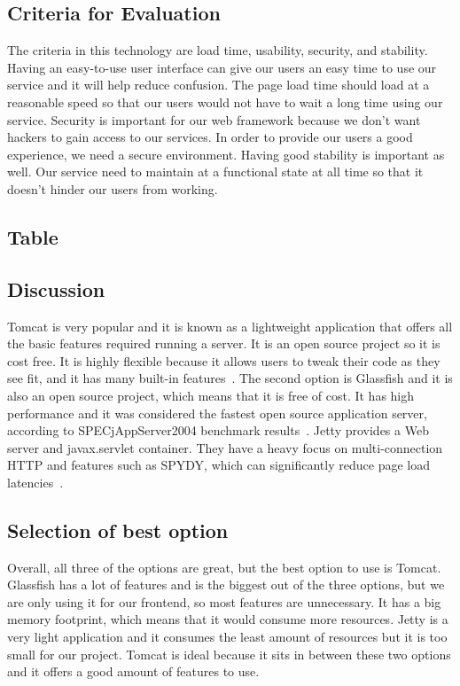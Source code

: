 \documentclass[10pt,letterpaper,onecolumn,journal]{IEEEtran}
\begin{document}
\subsection{Criteria for Evaluation}
The criteria in this technology are load time, usability, security, and stability.
Having an easy-to-use user interface can give our users an easy time to use our service and it will help reduce confusion.
The page load time should load at a reasonable speed so that our users would not have to wait a long time using our service.
Security is important for our web framework because we don’t want hackers to gain access to our services.
In order to provide our users a good experience, we need a secure environment.
Having good stability is important as well.
Our service need to maintain at a functional state at all time so that it doesn’t hinder our users from working.
\subsection{Table}
\subsection{Discussion}
Tomcat is very popular and it is known as a lightweight application that offers all the basic features required running a server.
It is an open source project so it is cost free.
It is highly flexible because it allows users to tweak their code as they see fit, and it has many built-in features~\cite{tomcat}.
The second option is Glassfish and it is also an open source project, which means that it is free of cost.
It has high performance and it was considered the fastest open source application server, according to SPECjAppServer2004 benchmark results~\cite{glassfish}.
Jetty provides a Web server and javax.servlet container.
They have a heavy focus on multi-connection HTTP and features such as SPYDY, which can significantly reduce page load latencies~\cite{jetty}.
\subsection{Selection of best option}
Overall, all three of the options are great, but the best option to use is Tomcat.
Glassfish has a lot of features and is the biggest out of the three options, but we are only using it for our frontend, so most features are unnecessary.
It has a big memory footprint, which means that it would consume more resources.
Jetty is a very light application and it consumes the least amount of resources but it is too small for our project.
Tomcat is ideal because it sits in between these two options and it offers a good amount of features to use.
\end{document}
